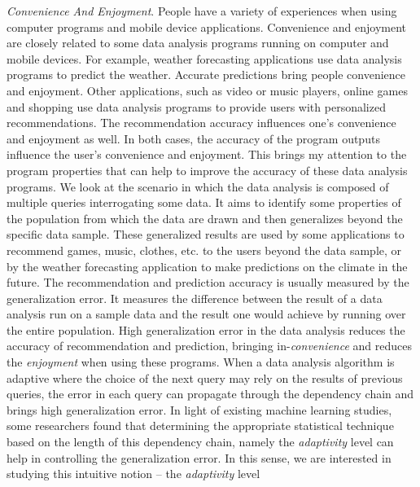 \emph{Convenience And Enjoyment}. People have a variety of experiences when using computer programs and mobile device applications. 
Convenience and enjoyment
are closely related to some data analysis programs running on computer and mobile devices. For example, weather forecasting applications use data analysis programs to predict the weather. Accurate predictions bring people convenience and enjoyment. Other applications, such as video or music players, online games and shopping use data analysis programs to provide users with personalized recommendations. The recommendation accuracy influences one's convenience and enjoyment as well.
In both cases, the accuracy of the program
outputs influence the user's convenience and enjoyment.
This brings my attention to
the program properties
that can help to improve the accuracy of
these
 data analysis 
programs.
We look at the scenario
in which the data analysis is composed of multiple queries interrogating some data.
It aims to identify some properties of the population from which the data are drawn
and then generalizes beyond the specific data sample.
These generalized results are used by some applications to recommend games, music, clothes, etc. to the
users beyond the data sample, or by the weather forecasting application to make predictions on the climate in the future.
The recommendation and prediction accuracy is usually measured by the generalization error.
It measures the difference between the result of a 
data analysis run on a sample data 
and the result one would achieve
by
running over the entire population.
High generalization error in the data analysis reduces the accuracy of recommendation and prediction,
bringing in-\emph{convenience} and reduces the \emph{enjoyment} when using these programs.
When a data analysis algorithm is adaptive where the choice of the next query may rely on the results of previous queries, the error in each query can propagate through
the dependency chain and brings high generalization error. 
In light of existing machine learning studies, some researchers found that 
determining the appropriate statistical technique based on the length of this dependency chain, namely the \emph{adaptivity} level can help in controlling 
the generalization error.
In this sense, we are interested in studying this intuitive notion -- the \emph{adaptivity} level
